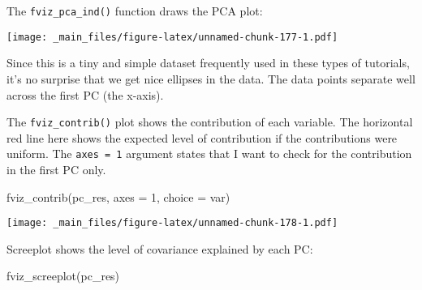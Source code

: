 \documentclass[
]{book}
\newenvironment{Shaded}{\begin{snugshade}}{\end{snugshade}}
\newcommand{\AttributeTok}[1]{\textcolor[rgb]{0.77,0.63,0.00}{#1}}
\newcommand{\ConstantTok}[1]{\textcolor[rgb]{0.00,0.00,0.00}{#1}}
\newcommand{\DecValTok}[1]{\textcolor[rgb]{0.00,0.00,0.81}{#1}}
\newcommand{\FunctionTok}[1]{\textcolor[rgb]{0.00,0.00,0.00}{#1}}
\newcommand{\NormalTok}[1]{#1}
\newcommand{\OtherTok}[1]{\textcolor[rgb]{0.56,0.35,0.01}{#1}}
\newcommand{\SpecialCharTok}[1]{\textcolor[rgb]{0.00,0.00,0.00}{#1}}
\newcommand{\StringTok}[1]{\textcolor[rgb]{0.31,0.60,0.02}{#1}}
\begin{document}
The \texttt{fviz\_pca\_ind()} function draws the PCA plot:

\begin{Shaded}
\end{Shaded}

\texttt{[image: \_main\_files/figure-latex/unnamed-chunk-177-1.pdf]}

Since this is a tiny and simple dataset frequently used in these types of tutorials, it's no surprise that we get nice ellipses in the data. The data points separate well across the first PC (the x-axis).

The \texttt{fviz\_contrib()} plot shows the contribution of each variable. The horizontal red line here shows the expected level of contribution if the contributions were uniform. The \texttt{axes\ =\ 1} argument states that I want to check for the contribution in the first PC only.

\begin{Shaded}
\begin{Highlighting}[]
\FunctionTok{fviz\_contrib}\NormalTok{(pc\_res, }\AttributeTok{axes =} \DecValTok{1}\NormalTok{, }\AttributeTok{choice =} \StringTok{\textquotesingle{}var\textquotesingle{}}\NormalTok{)}
\end{Highlighting}
\end{Shaded}

\texttt{[image: \_main\_files/figure-latex/unnamed-chunk-178-1.pdf]}

Screeplot shows the level of covariance explained by each PC:

\begin{Shaded}
\begin{Highlighting}[]
\FunctionTok{fviz\_screeplot}\NormalTok{(pc\_res)}
\end{Highlighting}
\end{Shaded}
\end{document}
